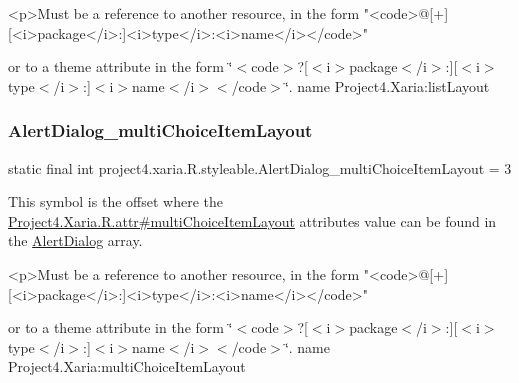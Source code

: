 \begin{DoxyVerb}      <p>Must be a reference to another resource, in the form "<code>@[+][<i>package</i>:]<i>type</i>:<i>name</i></code>"
\end{DoxyVerb}
 or to a theme attribute in the form \char`\"{}$<$code$>$?\mbox{[}$<$i$>$package$<$/i$>$\+:\mbox{]}\mbox{[}$<$i$>$type$<$/i$>$\+:\mbox{]}$<$i$>$name$<$/i$>$$<$/code$>$\char`\"{}.  name Project4.\+Xaria\+:list\+Layout \mbox{\label{classproject4_1_1xaria_1_1R_1_1styleable_a8c3f104371ce0fd47e43a3202a641816}} 
\subsubsection{\texorpdfstring{Alert\+Dialog\+\_\+multi\+Choice\+Item\+Layout}{AlertDialog\_multiChoiceItemLayout}}
{\footnotesize\ttfamily static final int project4.\+xaria.\+R.\+styleable.\+Alert\+Dialog\+\_\+multi\+Choice\+Item\+Layout = 3\hspace{0.3cm}{\ttfamily [static]}}

This symbol is the offset where the \hyperlink{}{Project4.\+Xaria.\+R.\+attr\#multi\+Choice\+Item\+Layout} attribute\textquotesingle{}s value can be found in the \hyperlink{classproject4_1_1xaria_1_1R_1_1styleable_a03310da91bbeadbad8196e09427a2ba7}{Alert\+Dialog} array.

\begin{DoxyVerb}      <p>Must be a reference to another resource, in the form "<code>@[+][<i>package</i>:]<i>type</i>:<i>name</i></code>"
\end{DoxyVerb}
 or to a theme attribute in the form \char`\"{}$<$code$>$?\mbox{[}$<$i$>$package$<$/i$>$\+:\mbox{]}\mbox{[}$<$i$>$type$<$/i$>$\+:\mbox{]}$<$i$>$name$<$/i$>$$<$/code$>$\char`\"{}.  name Project4.\+Xaria\+:multi\+Choice\+Item\+Layout \mbox{\label{classproject4_1_1xaria_1_1R_1_1styleable_a9b45eea7b3a28fece617988bdf526ee4}} 

